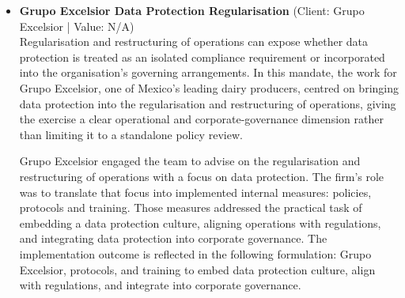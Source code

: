 \documentclass[11pt]{article}
\begin{document}
\begin{itemize}
Hotel Riazor instructed the team to advise on strengthening its personal data protection and governance framework. The mandate centred on reinforcing the Personal Data Department and on translating the governance objective into implemented policies and procedures for lawful data handling. The work was therefore directed not only at the internal departmental structure responsible for personal data, but also at embedding lawful data-handling procedures within the client’s broader operational efficiency and compliance programme.

The concrete result recorded for the engagement was the reinforcement of the Personal Data Department and the implementation of policies and procedures for lawful data handling, integrated into the broader operational efficiency and compliance programme. As stated in the underlying record: Hotel Riazor implemented policies and procedures for lawful data handling, integrated into the broader operational efficiency and compliance programme.

Arturo González de Araujo, Ernesto Zavala and Damián Ortega were the Lead Partners on the matter. Their involvement in advising on the strengthened personal data protection and governance framework, reinforcing the Personal Data Department, and implementing policies and procedures for lawful data handling demonstrates partner-led work connecting data protection with Hotel Riazor’s operational efficiency and compliance programme.
\item \textbf{Grupo Excelsior Data Protection Regularisation} (Client: Grupo Excelsior | Value: N/A)\\ Regularisation and restructuring of operations can expose whether data protection is treated as an isolated compliance requirement or incorporated into the organisation’s governing arrangements. In this mandate, the work for Grupo Excelsior, one of Mexico’s leading dairy producers, centred on bringing data protection into the regularisation and restructuring of operations, giving the exercise a clear operational and corporate-governance dimension rather than limiting it to a standalone policy review.

Grupo Excelsior engaged the team to advise on the regularisation and restructuring of operations with a focus on data protection. The firm’s role was to translate that focus into implemented internal measures: policies, protocols and training. Those measures addressed the practical task of embedding a data protection culture, aligning operations with regulations, and integrating data protection into corporate governance. The implementation outcome is reflected in the following formulation: Grupo Excelsior, protocols, and training to embed data protection culture, align with regulations, and integrate into corporate governance.


\end{itemize}
\end{document}
